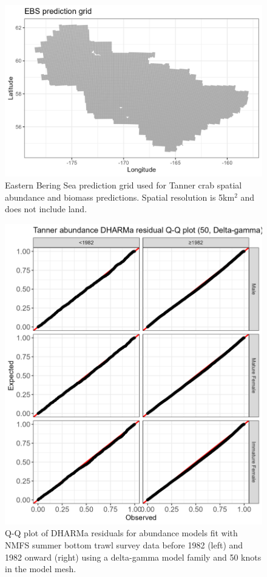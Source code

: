 \documentclass[
]{article}
\begin{document}
\begin{figure}

{\centering \includegraphics[width=6in]{../BAIRDI/Figures/EBS_predgrid} 

}

\caption{Eastern Bering Sea prediction grid used for Tanner crab spatial abundance and biomass predictions. Spatial resolution is 5km$^2$ and does not include land.}\label{fig:bairdi-EBS-grid}
\end{figure}

\begin{figure}

{\centering \includegraphics[width=6in]{../BAIRDI/Figures/DHARMa_abundance_50-Delta-gamma_QQplot} 

}

\caption{Q-Q plot of DHARMa residuals for abundance models fit with NMFS summer bottom trawl survey data before 1982 (left) and 1982 onward (right) using a delta-gamma model family and 50 knots in the model mesh.}\label{fig:DHARMa-abund-QQ-50}
\end{figure}
\end{document}
